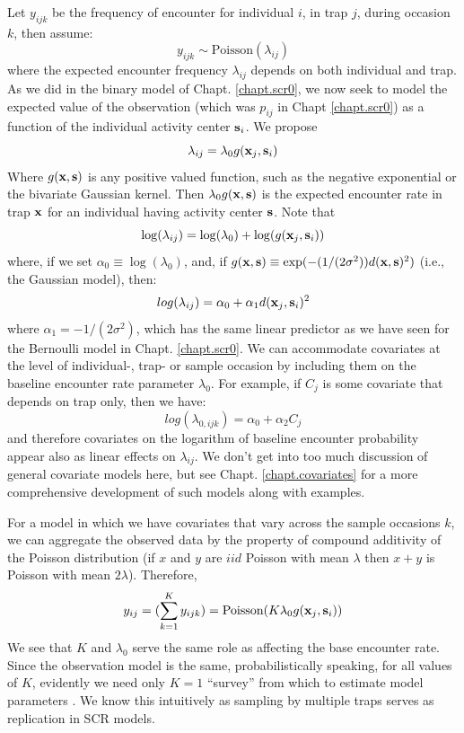 Let $y_{ijk}$ be the frequency of encounter for
individual $i$, in trap $j$, during occasion $k$, then assume:
\[
 y_{ijk} \sim \mbox{Poisson}(\lambda_{ij})
\]
where the expected encounter frequency $\lambda_{ij}$ depends on both
individual and trap. As we did in the binary model of
Chapt. \ref{chapt.scr0}, we
now seek to model the expected value of the observation (which was
$p_{ij}$ in Chapt \ref{chapt.scr0}) as a function of the individual activity center
${\bf s}_{i}$.
We propose
\[
 \lambda_{ij} = \lambda_{0}  g({\bf x}_{j},{\bf s}_{i})
\]
Where $g({\bf x},{\bf s})$ is any positive valued function, such as
the negative exponential or the bivariate Gaussian kernel.
Then $\lambda_{0}g({\bf x},{\bf s})$ is the expected encounter rate in trap
${\bf x}$ for an individual having activity center ${\bf s}$.  Note
that
\[
 \log(\lambda_{ij}) = \log(\lambda_{0}) + \log(  g({\bf x}_{j},{\bf
   s}_{i}) )
\]
where, if we set $\alpha_{0} \equiv \log(\lambda_{0})$, and, if 
$g({\bf x},{\bf s}) \equiv \exp(-(1/(2\sigma^2)) d({\bf x},{\bf s})^2)$
(i.e., the Gaussian model), then:
\begin{equation}
 log(\lambda_{ij}) = \alpha_{0} + \alpha_{1} d({\bf x}_{j},{\bf s}_{i})^{2}
\label{poisson-mn.eq.lp}
\end{equation}
where $\alpha_{1} = -1/(2\sigma^2)$, 
which has the same linear predictor as we have seen for the Bernoulli
model in Chapt. \ref{chapt.scr0}.  We can accommodate covariates at
the level of individual-, trap- or sample occasion by including them
on the baseline encounter rate parameter $\lambda_{0}$. For example,
if $C_{j}$ is some covariate that depends on trap only, then we have:
\[
log(\lambda_{0,ijk}) = \alpha_{0} + \alpha_{2} C_{j}
\]
and therefore covariates on the logarithm of baseline encounter
probability appear also as linear effects on $\lambda_{ij}$.  We don't
get into too much discussion of general covariate models here, but see
Chapt. \ref{chapt.covariates} for a more comprehensive development of
such models along with examples. 


For a  model in which we have covariates that vary across
the sample occasions  $k$, we can aggregate the observed data by the
property of compound additivity of the Poisson distribution (if $x$ and
$y$ are $iid$ Poisson with mean $\lambda$ then $x+y$ is Poisson with
mean $2\lambda$). Therefore,
\[
y_{ij} = (\sum_{k=1}^{K} y_{ijk}) =  \mbox{Poisson}(K  \lambda_{0}
g({\bf x}_{j},{\bf s}_{i}) )
\]
We see that $K$ and $\lambda_{0}$ serve the same role as affecting the
base encounter rate. Since the observation model is the same,
probabilistically speaking, for all values of $K$, evidently we need
only $K=1$ ``survey'' from which to estimate model parameters \citep{efford_etal:2009ecol}. We know
this intuitively as sampling by multiple traps serves as replication
in SCR models.

